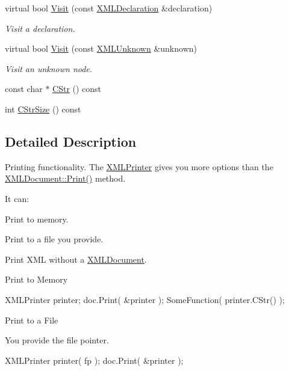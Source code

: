 \begin{DoxyCompactItemize}
virtual bool \hyperlink{classtinyxml2_1_1_x_m_l_printer_acfc625b2549304b9c7eb85ebd5c5eb39}{Visit} (const \hyperlink{classtinyxml2_1_1_x_m_l_declaration}{X\-M\-L\-Declaration} \&declaration)
\begin{DoxyCompactList}\small\item\em Visit a declaration. \end{DoxyCompactList}\item 
virtual bool \hyperlink{classtinyxml2_1_1_x_m_l_printer_ab8af5455bbf9e4be2663e6642fcd7e32}{Visit} (const \hyperlink{classtinyxml2_1_1_x_m_l_unknown}{X\-M\-L\-Unknown} \&unknown)
\begin{DoxyCompactList}\small\item\em Visit an unknown node. \end{DoxyCompactList}\item 
const char $\ast$ \hyperlink{classtinyxml2_1_1_x_m_l_printer_a4a1b788e11b540921ec50687cd2b24a9}{C\-Str} () const 
\item 
int \hyperlink{classtinyxml2_1_1_x_m_l_printer_a02c3c5f8c6c007dcbaf10595d9e22bf0}{C\-Str\-Size} () const 
\end{DoxyCompactItemize}


\subsection{Detailed Description}
Printing functionality. The \hyperlink{classtinyxml2_1_1_x_m_l_printer}{X\-M\-L\-Printer} gives you more options than the \hyperlink{classtinyxml2_1_1_x_m_l_document_a686ea28672c0e0c60383ec28148c1ac0}{X\-M\-L\-Document\-::\-Print()} method.

It can\-:
\begin{DoxyEnumerate}
\item Print to memory.
\item Print to a file you provide.
\item Print X\-M\-L without a \hyperlink{classtinyxml2_1_1_x_m_l_document}{X\-M\-L\-Document}.
\end{DoxyEnumerate}

Print to Memory

\begin{DoxyVerb}XMLPrinter printer;
doc.Print( &printer );
SomeFunction( printer.CStr() );
\end{DoxyVerb}


Print to a File

You provide the file pointer. \begin{DoxyVerb}XMLPrinter printer( fp );
doc.Print( &printer );
\end{DoxyVerb}


